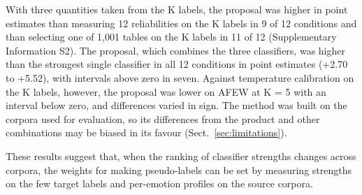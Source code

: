 With three quantities taken from the K labels, the proposal was higher in point estimates than measuring 12 reliabilities on the K labels in 9 of 12 conditions and than selecting one of 1,001 tables on the K labels in 11 of 12 (Supplementary Information S2). The proposal, which combines the three classifiers, was higher than the strongest single classifier in all 12 conditions in point estimates (+2.70 to +5.52\pt), with intervals above zero in seven. Against temperature calibration on the K labels, however, the proposal was lower on AFEW at K = 5 with an interval below zero, and differences varied in sign. The method was built on the corpora used for evaluation, so its differences from the product and other combinations may be biased in its favour (Sect.~\ref{sec:limitations}).

These results suggest that, when the ranking of classifier strengths changes across corpora, the weights for making pseudo-labels can be set by measuring strengths on the few target labels and per-emotion profiles on the source corpora.
